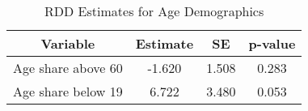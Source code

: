 \begin{table}

\caption{\label{tab:tab:age_demographics}RDD Estimates for Age Demographics}
\centering
\begin{tabular}[t]{cccc}
\toprule
Variable & Estimate & SE & p-value\\
\midrule
Age share above 60 & -1.620 & 1.508 & 0.283\\
Age share below 19 & 6.722 & 3.480 & 0.053\\
\bottomrule
\end{tabular}
\end{table}
